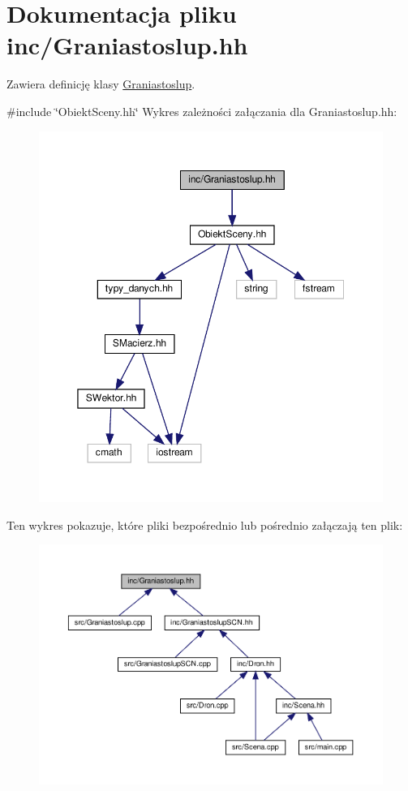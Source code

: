 \hypertarget{Graniastoslup_8hh}{}\section{Dokumentacja pliku inc/\+Graniastoslup.hh}
\label{Graniastoslup_8hh}


Zawiera definicję klasy \hyperlink{classGraniastoslup}{Graniastoslup}.  


{\ttfamily \#include \char`\"{}Obiekt\+Sceny.\+hh\char`\"{}}\newline
Wykres zależności załączania dla Graniastoslup.\+hh\+:\nopagebreak
\begin{figure}[H]
\begin{center}
\leavevmode
\includegraphics[width=350pt]{Graniastoslup_8hh__incl}
\end{center}
\end{figure}
Ten wykres pokazuje, które pliki bezpośrednio lub pośrednio załączają ten plik\+:\nopagebreak
\begin{figure}[H]
\begin{center}
\leavevmode
\includegraphics[width=350pt]{Graniastoslup_8hh__dep__incl}
\end{center}
\end{figure}
